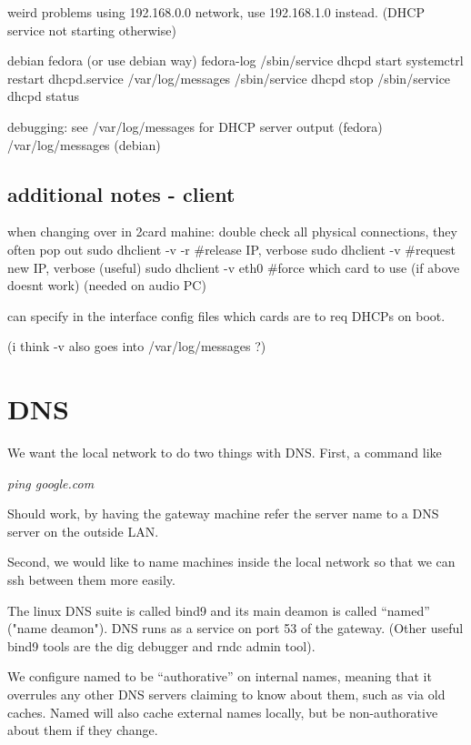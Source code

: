 \documentclass[oneside,english]{scrbook}
\begin{document}
weird problems using 192.168.0.0 network, use 192.168.1.0 instead. (DHCP service not starting otherwise)

  debian                fedora  (or use debian way)             fedora-log
/sbin/service dhcpd start       systemctrl restart dhcpd.service    /var/log/messages
/sbin/service dhcpd stop
/sbin/service dhcpd status

debugging: see /var/log/messages for DHCP server output (fedora)
           /var/log/messages   (debian)

\subsection{additional notes - client}

when changing over in 2card mahine:
    double check all physical connections, they often pop out
    sudo dhclient -v -r   #release IP, verbose
    sudo dhclient -v      #request new IP, verbose (useful)
    sudo dhclient -v eth0     #force which card to use (if above doesnt work) (needed on audio PC)

can specify in the interface config files which cards are to req DHCPs on boot.

(i think -v also goes into /var/log/messages ?)



\section{DNS}

We want the local network to do two things with DNS. First, a command
like

\emph{ping google.com}

Should work, by having the gateway machine refer the server name to
a DNS server on the outside LAN.

Second, we would like to name machines inside the local network so
that we can ssh between them more easily.

The linux DNS suite is called bind9 and its main deamon is called
``named'' ("name deamon"). DNS runs as a service on port 53 of the gateway. (Other
useful bind9 tools are the dig debugger and rndc admin tool).

We configure named to be ``authorative'' on internal names, meaning
that it overrules any other DNS servers claiming to know about them,
such as via old caches. Named will also cache external names locally,
but be non-authorative about them if they change.
\end{document}
